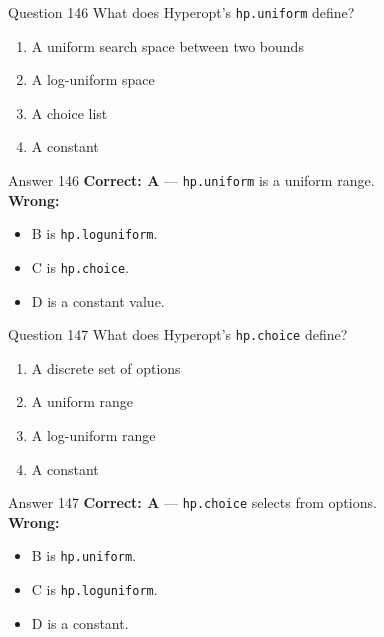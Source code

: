 \documentclass[aspectratio=169,11pt]{beamer}
\begin{document}
	\begin{frame}{Question 146}
		What does Hyperopt's \texttt{hp.uniform} define?
		\begin{enumerate}[label=\Alph*.]
			\item A uniform search space between two bounds
			\item A log-uniform space
			\item A choice list
			\item A constant
		\end{enumerate}
	\end{frame}
	\begin{frame}{Answer 146}
		\textbf{Correct: A} --- \texttt{hp.uniform} is a uniform range.\\
		\vspace{0.5em}
		\textbf{Wrong:}
		\begin{itemize}
			\item B is \texttt{hp.loguniform}.
			\item C is \texttt{hp.choice}.
			\item D is a constant value.
		\end{itemize}
	\end{frame}
	
	\begin{frame}{Question 147}
		What does Hyperopt's \texttt{hp.choice} define?
		\begin{enumerate}[label=\Alph*.]
			\item A discrete set of options
			\item A uniform range
			\item A log-uniform range
			\item A constant
		\end{enumerate}
	\end{frame}
	\begin{frame}{Answer 147}
		\textbf{Correct: A} --- \texttt{hp.choice} selects from options.\\
		\vspace{0.5em}
		\textbf{Wrong:}
		\begin{itemize}
			\item B is \texttt{hp.uniform}.
			\item C is \texttt{hp.loguniform}.
			\item D is a constant.
		\end{itemize}
	\end{frame}
	
\end{document}
